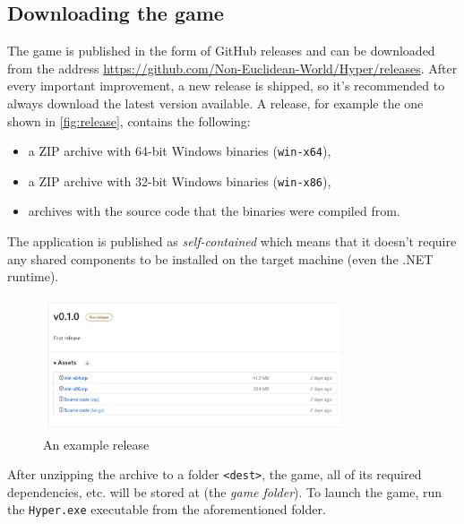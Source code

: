 \subsection{Downloading the game}
The game is published in the form of GitHub releases and can be downloaded from the address \url{https://github.com/Non-Euclidean-World/Hyper/releases}.
After every important improvement, a new release is shipped, so it's recommended to always download the latest version available.
A release, for example the one shown in \autoref{fig:release}, contains the following:
\begin{itemize}
    \item a ZIP archive with 64-bit Windows binaries (\texttt{win-x64}),
    \item a ZIP archive with 32-bit Windows binaries (\texttt{win-x86}),
    \item archives with the source code that the binaries were compiled from.
\end{itemize}

The application is published as \textit{self-contained} which means that it doesn't require any shared components to be installed on the target machine (even the .NET runtime).

\begin{figure}[H]
    \centering
    \includegraphics[width=0.8\textwidth]{sections/installation_instruction/resources/release-download.png}
    \caption{An example release}
    \label{fig:release}
\end{figure}

After unzipping the archive to a folder \texttt{<dest>}, the game, all of its required dependencies, etc. will be stored at  (the \textit{game folder}).
To launch the game, run the \texttt{Hyper.exe} executable from the aforementioned folder.